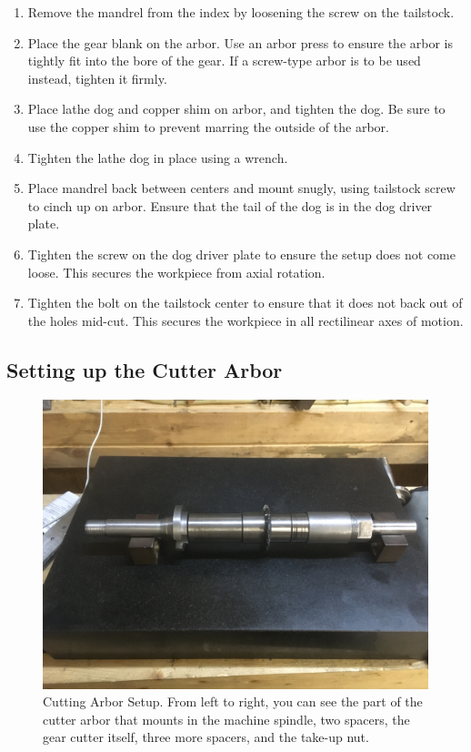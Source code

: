 \documentclass[12pt,twoside,letterpaper]{article}
\begin{document}
\begin{enumerate}
	\item Remove the mandrel from the index by loosening the screw on the tailstock.
	\item Place the gear blank on the arbor. Use an arbor press to ensure the arbor is tightly fit into the bore of the gear. If a screw-type arbor is to be used instead, tighten it firmly.
	\item Place lathe dog and copper shim on arbor, and tighten the dog. Be sure to use the copper shim to prevent marring the outside of the arbor.
	\item Tighten the lathe dog in place using a wrench.
	\item Place mandrel back between centers and mount snugly, using tailstock screw to cinch up on arbor. Ensure that the tail of the dog is in the dog driver plate.
	\item Tighten the screw on the dog driver plate to ensure the setup does not come loose. This secures the workpiece from axial rotation.
	\item Tighten the bolt on the tailstock center to ensure that it does not back out of the holes mid-cut. This secures the workpiece in all rectilinear axes of motion.
\end{enumerate}


\subsection{Setting up the Cutter Arbor}
\begin{figure}[H]
\centering
\includegraphics[width=5in]{cutterArbor}
	\caption{Cutting Arbor Setup. From left to right, you can see the part of the cutter arbor that mounts in the machine spindle, two spacers, the gear cutter itself, three more spacers, and the take-up nut.}
\end{figure}
\end{document}
